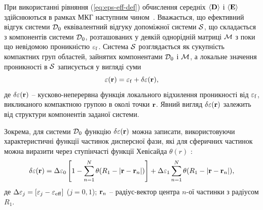 \documentclass[14pt,twoside]{vakthesis}
\begin{document}
При використанні рівняння (\ref{eq:eps-eff-def}) обчислення середніх $\langle{{\bf D}}\rangle$ і $\langle{{\bf E}}\rangle$ здійснюються в рамках МКГ наступним чином~\cite{Sushko2017}.
Вважається, що ефективний відгук системи ${\cal D}_0$ еквівалентний відгуку допоміжної системи $\cal{S}$, що складається з компонентів системи ${\cal D}_0$, розташованих у деякій однорідній матриці $\cal{M}$ з поки що невідомою проникністю $\varepsilon_{\rm f}$. Система $\cal{S}$ розглядається як сукупність  компактних груп областей, зайнятих компонентами ${\cal D}_0$ і $\cal M$, а локальне значення проникності в $\cal{S}$ записується у вигляді суми
\begin{equation}\label{eq:eps-local-diel}
\varepsilon({\bf r}) = \varepsilon_{\rm f} + \delta\varepsilon({\bf r}),
\end{equation}
де $\delta\varepsilon({\bf r})$ -- кусково-неперервна функція локального відхилення проникності від $\varepsilon_{\rm f}$, викликаного компактною групою в околі точки ${\bf r}$. Явний вигляд $\delta\varepsilon({\bf r})$ залежить від структури компонентів заданої системи.

Зокрема, для системи ${\cal D}_0$  функцію $\delta\varepsilon({\bf r})$ можна записати, використовуючи характеристичні функції частинок дисперсної фази, які для сферичних частинок  можна виразити через ступінчасті функції Хевісайда $\theta(r)$ \cite{Sushko2007, Sushko2009, Sushko2017}:
\begin{equation}\label{eq:delta-Brug-diel}
\delta{\varepsilon}({\bf r}) = \Delta{\varepsilon}_0 \left[ 1 - \sum\limits_{n=1}^N \theta(R_1 - |{\bf r} - {\bf r}_n|) \right] + \Delta{\varepsilon}_1\sum\limits_{n=1}^N \theta(R_1 - |{\bf r} - {\bf r}_n|),
\end{equation}
де $\Delta{\varepsilon}_j = [{\varepsilon}_j - {\varepsilon}_{\rm eff}]$ ($j = 0,1$); ${\bf r}_n$ -- радіус-вектор центра $n$-ої частинки з радіусом $R_1$.
\end{document}
